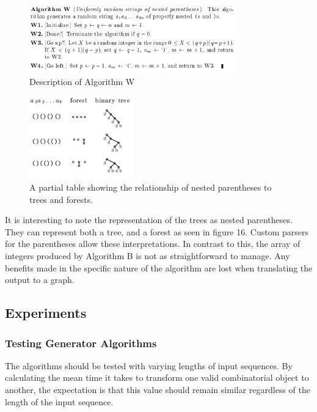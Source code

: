 \documentclass[12pt]{article}
\begin{document}
\begin{enumerate}
\begin{figure}[h]
\centering
\includegraphics[width=0.8\textwidth]{images/tree_W.PNG}
\caption{Description of Algorithm W \cite{tree_W}}
\end{figure}

\end{enumerate}
\vspace{1cm}
\begin{figure}[h]
\centering
\includegraphics[width=0.4\textwidth]{images/table1.PNG}
\caption{A partial table showing the relationship of nested parentheses to trees and forests. \cite{tree_P}}
\end{figure}

It is interesting to note the representation of the trees as nested parentheses. They can represent both a tree, and a forest as seen in figure 16. Custom parsers for the parentheses allow these interpretations. In contrast to this, the array of integers produced by Algorithm B is not as straightforward to manage. Any benefits made in the specific nature of the algorithm are lost when translating the output to a graph.

\subsection{Experiments}
\subsubsection{Testing Generator Algorithms}

The algorithms should be tested with varying lengths of input sequences. By calculating the mean time it takes to transform one valid combinatorial object to another, the expectation is that this value should remain similar regardless of the length of the input sequence.
\end{document}
